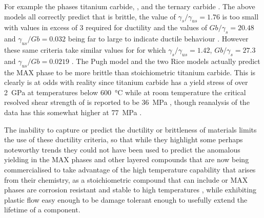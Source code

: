 For example the phases titanium carbide, , and the ternary carbide . The above models all correctly predict that  is brittle, the value of $\gamma_s / \gamma_{us} = 1.76$ is too small with values in excess of 3 required for ductility \cite{Price1992,Yu2003} and the values of $Gb/\gamma_s = 20.48$ and $\gamma_{us} / Gb = 0.032$ being far to large to indicate ductile behaviour \cite{Yu2003,Medvedeva2011}. However these same criteria take similar values for  for which $\gamma_s / \gamma_{us} = 1.42$, $Gb/\gamma_s = 27.3$ and $\gamma_{us} / Gb = 0.0219$ \cite{Medvedeva2011,Farle2015}. The Pugh model and the two Rice models \cite{Pugh1954,rice1974,Rice1992} actually predict the MAX phase to be more brittle than stoichiometric titanium carbide. This is clearly is at odds with reality since titanium carbide has a yield stress of over \SI{2}{\giga\pascal} at temperatures below \SI{600}{\celsius} \cite{Miracle1983} while at room temperature the critical resolved shear strength of  is reported to be \SI{36}{\mega\pascal} \cite{Barsoum1999}, though reanalysis of the data has this somewhat higher at \SI{77}{\mega\pascal} \cite{Humphrey2012}.


The inability to capture or predict the ductility or brittleness of materials limits the use of these ductility criteria, so that while they highlight some perhaps noteworthy trends they could not have been used to predict the anomalous yielding in the MAX phases and other layered compounds that are now being commercialised to take advantage of the high temperature capability that arises from their chemistry, as a stoichiometric compound that can include  or  MAX phases are corrosion resistant and stable to high temperatures \cite{Radovic2013}, while exhibiting plastic flow easy enough to be damage tolerant enough to usefully extend the lifetime of a component.





